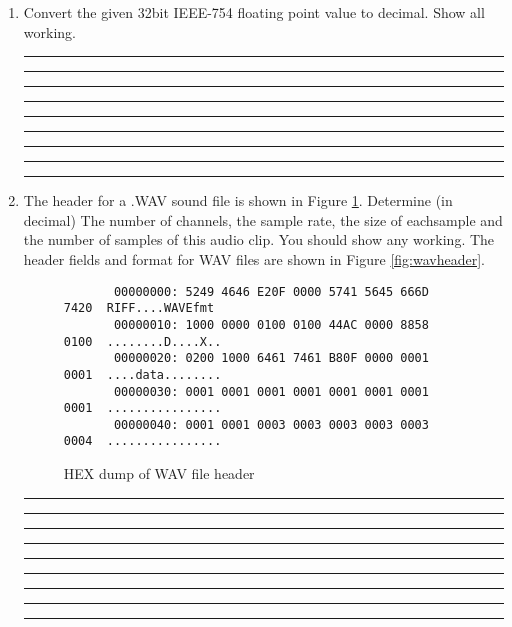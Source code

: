 \documentclass[a4paper,10pt]{article}
\begin{document}
\begin{enumerate}

\item Convert the given 32bit IEEE-754 floating point value to decimal. Show
all working.
\vspace{3mm}\hrule\vspace{7mm}\hrule\vspace{7mm}\hrule\vspace{7mm}\hrule\vspace{7mm}
\hrule\vspace{7mm}\hrule\vspace{7mm}\hrule\vspace{7mm}\hrule\vspace{7mm}
\hrule\vspace{3mm}

\newpage
\item  The header for a .WAV sound file is shown in Figure
\ref{fig:wavhex-ans}. Determine (in decimal) The number of channels, the sample rate, the size of eachsample and the number of samples of this audio clip. You should show any working. The header fields and format for WAV files are shown in Figure \ref{fig:wavheader}. 

\begin{figure}[h]
  \begin{center}
{\small

\begin{verbatim}
       00000000: 5249 4646 E20F 0000 5741 5645 666D 7420  RIFF....WAVEfmt
       00000010: 1000 0000 0100 0100 44AC 0000 8858 0100  ........D....X..
       00000020: 0200 1000 6461 7461 B80F 0000 0001 0001  ....data........
       00000030: 0001 0001 0001 0001 0001 0001 0001 0001  ................
       00000040: 0001 0001 0003 0003 0003 0003 0003 0004  ................
\end{verbatim}}

\caption{HEX dump of WAV file header}
  \end{center}
\label{fig:wavhex-ans}
\end{figure}

\vspace{3mm}\hrule\vspace{7mm}\hrule\vspace{7mm}\hrule\vspace{7mm}\hrule\vspace{7mm}
\hrule\vspace{7mm}\hrule\vspace{7mm}\hrule\vspace{7mm}\hrule\vspace{7mm}
\hrule\vspace{3mm}


\end{enumerate}
\end{document}
